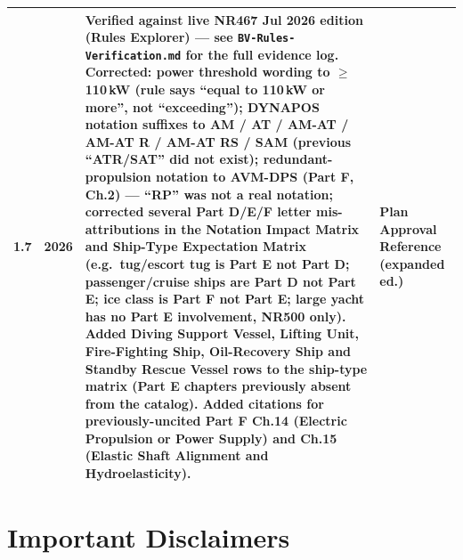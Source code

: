 \documentclass[11pt,a4paper]{report}
\begin{document}
\begin{table}[H]
\begin{tabular}{|c|c|p{6cm}|p{3cm}|}
\hline
1.7 & 2026 & \textbf{Verified against live NR467 Jul 2026 edition (Rules Explorer)} --- see \texttt{BV-Rules-Verification.md} for the full evidence log. Corrected: power threshold wording to \textbf{$\geq$110\,kW} (rule says ``equal to 110\,kW or more'', not ``exceeding''); DYNAPOS notation suffixes to \textbf{AM / AT / AM-AT / AM-AT R / AM-AT RS / SAM} (previous ``ATR/SAT'' did not exist); redundant-propulsion notation to \textbf{AVM-DPS} (Part F, Ch.2) --- ``RP'' was not a real notation; corrected several Part D/E/F letter mis-attributions in the Notation Impact Matrix and Ship-Type Expectation Matrix (e.g.\ tug/escort tug is Part E not Part D; passenger/cruise ships are Part D not Part E; ice class is Part F not Part E; large yacht has no Part E involvement, NR500 only). Added \textbf{Diving Support Vessel, Lifting Unit, Fire-Fighting Ship, Oil-Recovery Ship and Standby Rescue Vessel} rows to the ship-type matrix (Part E chapters previously absent from the catalog). Added citations for previously-uncited Part F Ch.14 (Electric Propulsion or Power Supply) and Ch.15 (Elastic Shaft Alignment and Hydroelasticity). & Plan Approval Reference (expanded ed.) \\
\hline
\end{tabular}
\end{table}

\section{Important Disclaimers}
\end{document}
